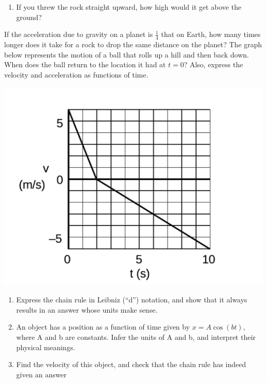 \documentclass[12pt,addpoints]{exam}
\begin{document}
\begin{center}
\begin{questions}
\begin{enumerate}[label=(\alph*)]
				\item If you threw the rock straight upward, how
				high would it get above the ground?\vspace{1in}
			\end{enumerate}
			\question If the acceleration due to gravity on a planet is $\frac{1}{4}$ that on Earth, how many times longer does it take for a rock to drop the same distance on the planet?\vspace{1.5in}
			\question The graph below represents the motion of a ball that rolls up a hill and then back down. When does the ball return to the location it had at $t = 0$? Also, express the velocity and acceleration as functions of time.
			\begin{center}
				\includegraphics[scale=0.3]{graph1.png}
			\end{center}
			\vspace{1in}
			\question 
			\begin{enumerate}[label=(\alph*)]
				\item Express the chain rule in Leibniz
				(“d”) notation, and show that it always results
				in an answer whose units make sense.\vspace{1in}
				\item An object has a position as a function of
				time given by $x = A\cos(bt)$, where A and b
				are constants. Infer the units of A and b, and
				interpret their physical meanings.\vspace{1in}
				\item Find the velocity of this object, and check
				that the chain rule has indeed given an answer

\end{enumerate}
\end{questions}
\end{center}
\end{document}
